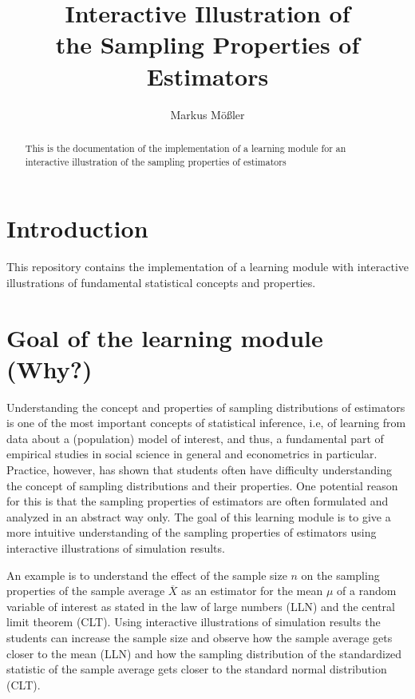 \documentclass{article}
\title{Interactive Illustration of \\ the Sampling Properties of \\ Estimators}
\author{Markus M\"o\ss ler}
\begin{document}
	
\maketitle
	
\begin{abstract}
This is the documentation of the implementation of a learning module for an interactive illustration of the sampling properties of estimators
\end{abstract}

\section{Introduction}

This repository contains the implementation of a learning module with interactive illustrations of fundamental statistical concepts and properties.

\section{Goal of the learning module (Why?)}

Understanding the concept and properties of sampling distributions of estimators is one of the most important concepts of statistical inference, i.e, of learning from data about a (population) model of interest, and thus, a fundamental part of empirical studies in social science in general and econometrics in particular. 
%
Practice, however, has shown that students often have difficulty understanding the concept of sampling distributions and their properties. 
%
One potential reason for this is that the sampling properties of estimators are often formulated and analyzed in an abstract way only. 
%
The goal of this learning module is to give a more intuitive understanding of the sampling properties of estimators using interactive illustrations of simulation results. 

An example is to understand the effect of the sample size $n$ on the sampling properties of the sample average $\overline{X}$ as an estimator for the mean $\mu$ of a random variable of interest as stated in the law of large numbers (LLN) and the central limit theorem (CLT). 
%
Using interactive illustrations of simulation results the students can increase the sample size and observe how the sample average gets closer to the mean (LLN) and how the sampling distribution of the standardized statistic of the sample average gets closer to the standard normal distribution (CLT).
\end{document}
